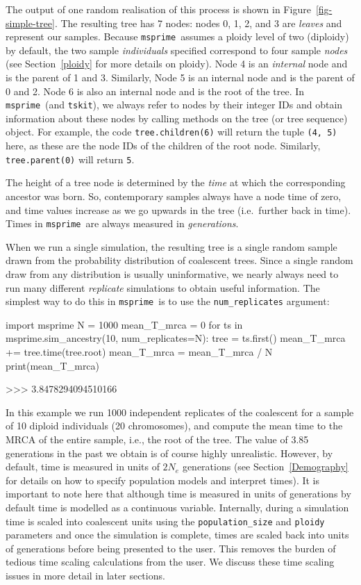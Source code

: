 \documentclass[graybox]{svmult}
\newcommand{\msprime}[0]{\texttt{msprime}}
\newcommand{\tskit}[0]{\texttt{tskit}}
\begin{document}
The output of one random realisation of this process is shown in
Figure~\ref{fig-simple-tree}. The resulting tree has 7 nodes:
nodes 0, 1, 2, and 3 are \emph{leaves} and
represent our samples.
Because \msprime\ assumes a ploidy level of two (diploidy) by default,
the two sample \emph{individuals} specified correspond to four
sample \emph{nodes}
(see Section~\ref{ploidy} for more details on ploidy).
Node 4 is an \emph{internal} node and is the
parent of 1 and 3. Similarly, Node 5 is an internal node and is the
parent of 0 and 2. Node 6 is also an internal node and is the root of
the tree. In \msprime\ (and \tskit), we always refer to nodes by their integer IDs and
obtain information about these nodes by calling methods on the tree
(or tree sequence) object. For example, the code \texttt{tree.children(6)} will return the
tuple \texttt{(4,\ 5)} here, as these are the node IDs of the children
of the root node. Similarly, \texttt{tree.parent(0)} will return
\texttt{5}.

The height of a tree node is determined by the \emph{time} at which the corresponding
ancestor was born. So,
contemporary samples always have a node time of zero, and time values
increase as we go upwards in the tree (i.e.\ further back in time). Times
in \msprime\ are always measured in \emph{generations}.

When we run a single simulation, the resulting tree is a single random
sample drawn from the probability distribution of coalescent trees. Since a
single random draw from any distribution is usually uninformative, we
nearly always need to run many different \emph{replicate} simulations to
obtain useful information. The simplest way to do this in \msprime\ is to
use the \texttt{num\_replicates} argument:

\begin{pythoncode}
import msprime
N = 1000
mean_T_mrca = 0
for ts in msprime.sim_ancestry(10, num_replicates=N):
    tree = ts.first()
    mean_T_mrca += tree.time(tree.root)
mean_T_mrca = mean_T_mrca / N
print(mean_T_mrca)

>>> 3.8478294094510166
\end{pythoncode}

In this example we run 1000 independent replicates of the coalescent for
a sample of 10 diploid individuals (20 chromosomes),
and compute the mean time to the MRCA of the entire sample, i.e., the root of the
tree. The value of 3.85 generations in the past we obtain is of course highly unrealistic.
However, by default, time is measured in units of \(2 N_e\) generations (see Section~\ref{Demography}
for details on how to specify population models and interpret times). It is important to note here
that although time is measured in units of generations by default time is modelled as a continuous variable. Internally,
during a simulation time is scaled into coalescent units
using the \texttt{population\_size} and \texttt{ploidy} parameters and once the
simulation is complete, times are scaled back into units of generations
before being presented to the user. This removes the burden of
tedious time scaling calculations from the user. We discuss these time
scaling issues in more detail in later sections.
\end{document}
